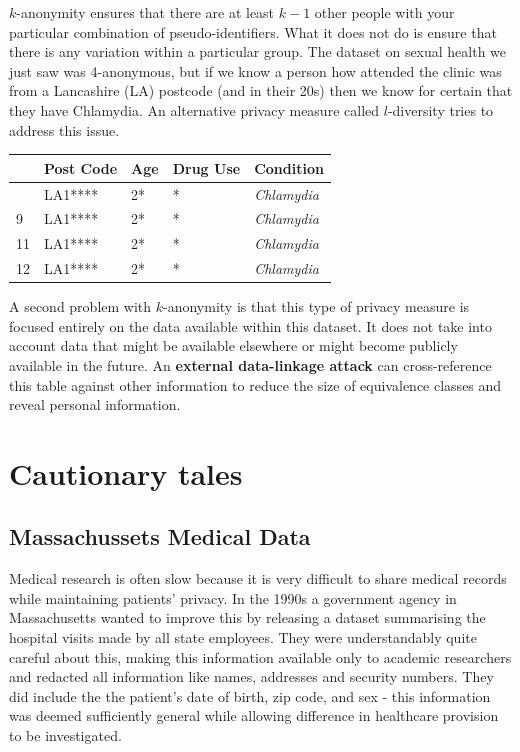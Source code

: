 \documentclass[
  letterpaper,
  DIV=11,
  numbers=noendperiod]{scrreprt}
\begin{document}
\(k\)-anonymity ensures that there are at least \(k-1\) other people
with your particular combination of pseudo-identifiers. What it does not
do is ensure that there is any variation within a particular group. The
dataset on sexual health we just saw was 4-anonymous, but if we know a
person how attended the clinic was from a Lancashire (LA) postcode (and
in their 20s) then we know for certain that they have Chlamydia. An
alternative privacy measure called \(l\)-diversity tries to address this
issue.

\begin{longtable}[]{@{}lllll@{}}
\toprule\noalign{}
& Post Code & Age & Drug Use & Condition \\
\midrule\noalign{}
\endhead
\bottomrule\noalign{}
\endlastfoot
8 & LA1**** & 2* & * & \emph{Chlamydia} \\
9 & LA1**** & 2* & * & \emph{Chlamydia} \\
11 & LA1**** & 2* & * & \emph{Chlamydia} \\
12 & LA1**** & 2* & * & \emph{Chlamydia} \\
\end{longtable}

A second problem with \(k\)-anonymity is that this type of privacy
measure is focused entirely on the data available within this dataset.
It does not take into account data that might be available elsewhere or
might become publicly available in the future. An \textbf{external
data-linkage attack} can cross-reference this table against other
information to reduce the size of equivalence classes and reveal
personal information.

\section{Cautionary tales}\label{cautionary-tales}

\subsection{Massachussets Medical
Data}\label{massachussets-medical-data}

Medical research is often slow because it is very difficult to share
medical records while maintaining patients' privacy. In the 1990s a
government agency in Massachusetts wanted to improve this by releasing a
dataset summarising the hospital visits made by all state employees.
They were understandably quite careful about this, making this
information available only to academic researchers and redacted all
information like names, addresses and security numbers. They did include
the the patient's date of birth, zip code, and sex - this information
was deemed sufficiently general while allowing difference in healthcare
provision to be investigated.
\end{document}
